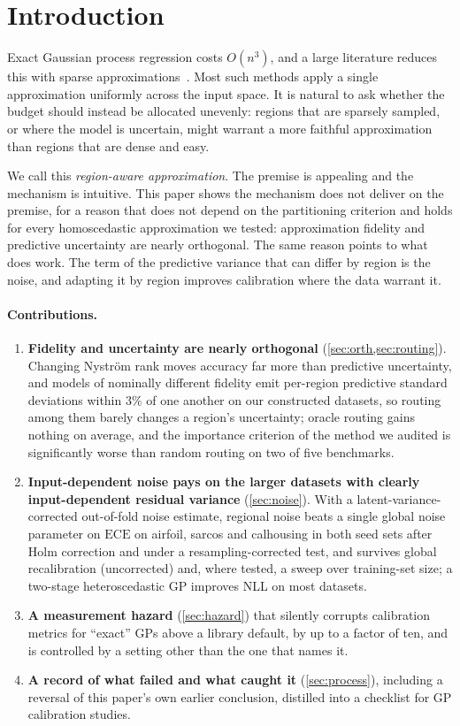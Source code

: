 \documentclass[11pt]{article}
\newcommand{\ece}{\mathrm{ECE}}
\begin{document}
\section{Introduction}
\label{sec:intro}

Exact Gaussian process regression costs $O(n^3)$, and a large literature reduces this
with sparse approximations~\citep{rasmussen2006, quinonero2005, titsias2009}. Most
such methods apply a single approximation uniformly across the input space. It is
natural to ask whether the budget should instead be allocated unevenly: regions that
are sparsely sampled, or where the model is uncertain, might warrant a more faithful
approximation than regions that are dense and easy.

We call this \emph{region-aware approximation}. The premise is appealing and the
mechanism is intuitive. This paper shows the mechanism does not deliver on the
premise, for a reason that does not depend on the partitioning criterion and holds for
every homoscedastic approximation we tested: approximation fidelity and predictive
uncertainty are nearly orthogonal. The same reason points to what does work. The term
of the predictive variance that can differ by region is the noise, and adapting it by
region improves calibration where the data warrant it.

\paragraph{Contributions.}
\begin{enumerate}
\item \textbf{Fidelity and uncertainty are nearly orthogonal}
(\cref{sec:orth,sec:routing}). Changing Nystr\"om rank moves accuracy far more than
predictive uncertainty, and models of nominally different fidelity emit per-region
predictive standard deviations within $3\%$ of one another on our constructed
datasets, so routing among them barely changes a region's uncertainty; oracle routing
gains nothing on average, and the importance criterion of the method we audited is
significantly worse than random routing on two of five benchmarks.
\item \textbf{Input-dependent noise pays on the larger datasets with clearly
input-dependent residual variance} (\cref{sec:noise}). With a latent-variance-corrected
out-of-fold noise estimate, regional noise beats a single global noise parameter on
$\ece$ on airfoil, sarcos and calhousing in both seed sets after Holm correction and
under a resampling-corrected test, and survives global recalibration (uncorrected) and,
where tested, a sweep over training-set size; a two-stage heteroscedastic GP improves
NLL on most datasets.
\item \textbf{A measurement hazard} (\cref{sec:hazard}) that silently corrupts
calibration metrics for ``exact'' GPs above a library default, by up to a factor of
ten, and is controlled by a setting other than the one that names it.
\item \textbf{A record of what failed and what caught it} (\cref{sec:process}),
including a reversal of this paper's own earlier conclusion, distilled into a
checklist for GP calibration studies.
\end{enumerate}
\end{document}
